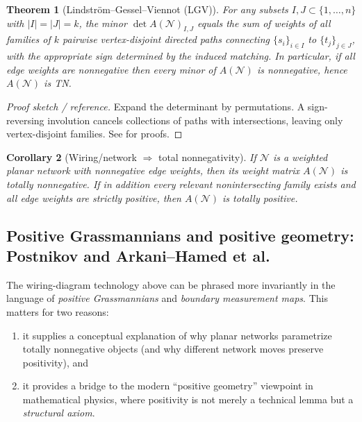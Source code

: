\documentclass[11pt,oneside]{amsbook}
\numberwithin{equation}{section}
\theoremstyle{plain}
\newtheorem{theorem}{Theorem}[section]
\newtheorem{corollary}[theorem]{Corollary}
\theoremstyle{definition}
\theoremstyle{remark}
\begin{document}
\begin{theorem}[Lindstr\"om--Gessel--Viennot (LGV)]
\label{thm:LGV}
For any subsets $I,J\subset\{1,\dots,n\}$ with $|I|=|J|=k$, the minor
$\det A(\mathcal{N})_{I,J}$ equals the sum of weights of all families of $k$ pairwise vertex-disjoint directed paths connecting $\{s_i\}_{i\in I}$ to $\{t_j\}_{j\in J}$, with the appropriate sign determined by the induced matching.
In particular, if all edge weights are nonnegative then every minor of $A(\mathcal{N})$ is nonnegative, hence $A(\mathcal{N})$ is TN.
\end{theorem}

\begin{proof}[Proof sketch / reference]
Expand the determinant by permutations.
A sign-reversing involution cancels collections of paths with intersections, leaving only vertex-disjoint families.
See \cite{GesselViennot1985Nonintersecting,Lindstrom1973Paths} for proofs.
\end{proof}

\begin{corollary}[Wiring/network $\Rightarrow$ total nonnegativity]
\label{cor:wiring_TN}
If $\mathcal{N}$ is a weighted planar network with nonnegative edge weights, then its weight matrix $A(\mathcal{N})$ is totally nonnegative.
If in addition every relevant nonintersecting family exists and all edge weights are \emph{strictly} positive, then $A(\mathcal{N})$ is totally positive.
\end{corollary}


\subsection{Positive Grassmannians and positive geometry: Postnikov and Arkani--Hamed et al.}
\label{sec:positive_grassmannian_total_positivity}

The wiring-diagram technology above can be phrased more invariantly in the language of \emph{positive Grassmannians} and \emph{boundary measurement maps}.
This matters for two reasons:
\begin{enumerate}[label=(\roman*)]
\item it supplies a conceptual explanation of why planar networks parametrize totally nonnegative objects (and why different network moves preserve positivity), and
\item it provides a bridge to the modern ``positive geometry'' viewpoint in mathematical physics, where positivity is not merely a technical lemma but a \emph{structural axiom}.
\end{enumerate}
\end{document}
